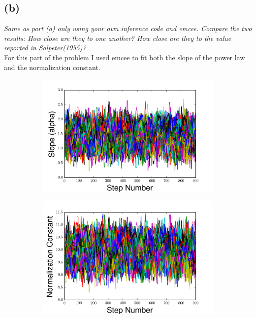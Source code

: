 \documentclass[english,11pt]{article}
\begin{document}
\subsection*{(b)}
\textit{Same as part (a) only using your own inference code and emcee. Compare the two results: How close are they to one another? How close are they to the value reported in Salpeter(1955)?}\\
For this part of the problem I used emcee to fit both the slope of the power law and the normalization constant.

\begin{figure}[H]
\caption{Emcee $\alpha$ and Normalization Constant vs. Step Number}
\centering
\begin{subfigure}{.4\textwidth}
  \centering
  \includegraphics[width=\linewidth]{m_step_emcee_prob3.png}
  \caption{}
  \label{fig:sub1x}
\end{subfigure}%
\begin{subfigure}{0.4\textwidth}
  \centering
  \includegraphics[width=\linewidth]{const_step_emcee_prob3.png}
  \caption{}
  \label{fig:sub2x}
\end{subfigure}
\label{fig:testx}
\end{figure}
\end{document}
